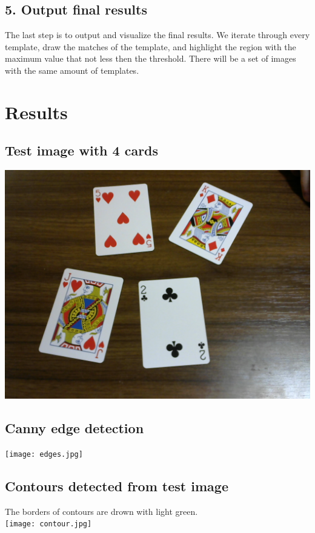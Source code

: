 \documentclass{article}
\begin{document}
\subsection*{5. Output final results}

The last step is to output and visualize the final results. We iterate through every template, draw the matches of the template, and highlight the region with the maximum value that not less then the threshold. There will be a set of images with the same amount of templates.

\section*{Results}

\subsection*{Test image with 4 cards}
\includegraphics[scale=0.3]{testImg.png}

\subsection*{Canny edge detection}
\texttt{[image: edges.jpg]}

\subsection*{Contours detected from test image}
The borders of contours are drown with light green.\\
\texttt{[image: contour.jpg]}
\end{document}
